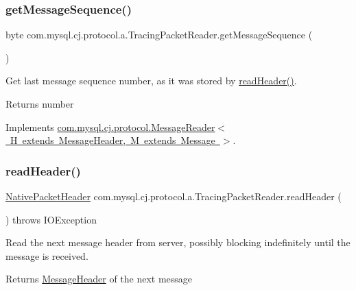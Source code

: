 \subsubsection{\texorpdfstring{get\+Message\+Sequence()}{getMessageSequence()}}
{\footnotesize\ttfamily byte com.\+mysql.\+cj.\+protocol.\+a.\+Tracing\+Packet\+Reader.\+get\+Message\+Sequence (\begin{DoxyParamCaption}{ }\end{DoxyParamCaption})}

Get last message sequence number, as it was stored by \mbox{\hyperlink{classcom_1_1mysql_1_1cj_1_1protocol_1_1a_1_1_tracing_packet_reader_a67550eb953a1d19c2ea8663e2336e2a3}{read\+Header()}}.

\begin{DoxyReturn}{Returns}
number 
\end{DoxyReturn}


Implements \mbox{\hyperlink{interfacecom_1_1mysql_1_1cj_1_1protocol_1_1_message_reader_ac4a36fb287c5308dd3d7e6157ef4e237}{com.\+mysql.\+cj.\+protocol.\+Message\+Reader$<$ H extends Message\+Header, M extends Message $>$}}.

\mbox{\label{classcom_1_1mysql_1_1cj_1_1protocol_1_1a_1_1_tracing_packet_reader_a67550eb953a1d19c2ea8663e2336e2a3}} 
\subsubsection{\texorpdfstring{read\+Header()}{readHeader()}}
{\footnotesize\ttfamily \mbox{\hyperlink{classcom_1_1mysql_1_1cj_1_1protocol_1_1a_1_1_native_packet_header}{Native\+Packet\+Header}} com.\+mysql.\+cj.\+protocol.\+a.\+Tracing\+Packet\+Reader.\+read\+Header (\begin{DoxyParamCaption}{ }\end{DoxyParamCaption}) throws I\+O\+Exception}

Read the next message header from server, possibly blocking indefinitely until the message is received.

\begin{DoxyReturn}{Returns}
\mbox{\hyperlink{interfacecom_1_1mysql_1_1cj_1_1protocol_1_1_message_header}{Message\+Header}} of the next message 
\end{DoxyReturn}

